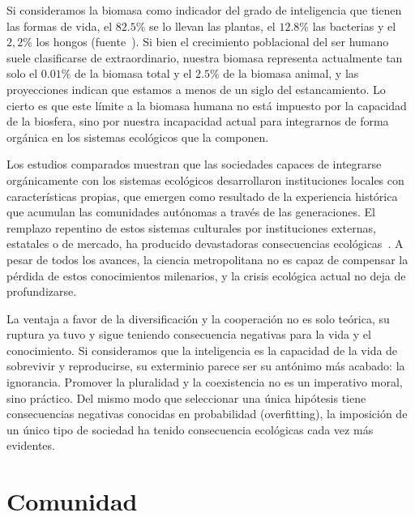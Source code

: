 \documentclass[a4paper,11pt]{book}
\theoremstyle{definition}
\begin{document}

Si consideramos la biomasa como indicador del grado de inteligencia que tienen las formas de vida, el $82.5$\% se lo llevan las plantas, el $12.8$\% las bacterias y el $2,2$\% los hongos (fuente~\cite{barOn2018-biomass}).
%
Si bien el crecimiento poblacional del ser humano suele clasificarse de extraordinario, nuestra biomasa representa actualmente tan solo el $0.01$\% de la biomasa total y el $2.5$\% de la biomasa animal, y las proyecciones indican que estamos a menos de un siglo del estancamiento.
%
Lo cierto es que este l\'imite a la biomasa humana no est\'a impuesto por la capacidad de la biosfera, sino por nuestra incapacidad actual para integrarnos de forma org\'anica en los sistemas ecol\'ogicos que la componen.


Los estudios comparados muestran que las sociedades capaces de integrarse org\'anicamente con los sistemas ecol\'ogicos desarrollaron instituciones locales con caracter\'isticas propias, que emergen como resultado de la experiencia hist\'orica que acumulan las comunidades aut\'onomas a trav\'es de las generaciones.
%
El remplazo repentino de estos sistemas culturales por instituciones externas, estatales o de mercado, ha producido devastadoras consecuencias ecol\'ogicas~\cite{segato2013-colonialidad}.
%
A pesar de todos los avances, la ciencia metropolitana no es capaz de compensar la p\'erdida de estos conocimientos milenarios, y la crisis ecol\'ogica actual no deja de profundizarse.


La ventaja a favor de la diversificaci\'on y la cooperaci\'on no es solo te\'orica, su ruptura ya tuvo y sigue teniendo consecuencia negativas para la vida y el conocimiento.
%
Si consideramos que la inteligencia es la capacidad de la vida de sobrevivir y reproducirse, su exterminio parece ser su ant\'onimo m\'as acabado: la ignorancia.
%
Promover la pluralidad y la coexistencia no es un imperativo moral, sino pr\'actico.
%
Del mismo modo que seleccionar una \'unica hip\'otesis tiene consecuencias negativas conocidas en probabilidad (overfitting), la imposici\'on de un \'unico tipo de sociedad ha tenido consecuencia ecol\'ogicas cada vez m\'as evidentes.


\section{Comunidad}
\end{document}
